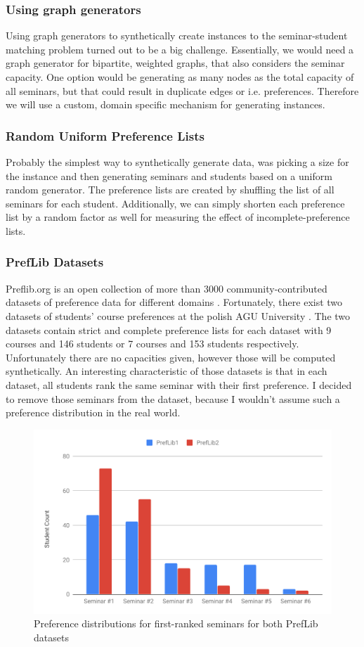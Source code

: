 \subsubsection{Using graph generators}
Using graph generators to synthetically create instances to the seminar-student matching problem turned out to be a big challenge. Essentially, we would need a graph generator for bipartite, weighted graphs, that also considers the seminar capacity. One option would be generating as many nodes as the total capacity of all seminars, but that could result in duplicate edges or i.e. preferences. Therefore we will use a custom, domain specific mechanism for generating instances.

\subsubsection{Random Uniform Preference Lists}
Probably the simplest way to synthetically generate data, was picking a size for the instance and then generating seminars and students based on a uniform random generator. The preference lists are created by shuffling the list of all seminars for each student. Additionally, we can simply shorten each preference list by a random factor as well for measuring the effect of incomplete-preference lists.

\subsubsection{PrefLib Datasets}
Preflib.org is an open collection of more than 3000 community-contributed datasets of preference data for different domains \cite{PrefLib}. Fortunately, there exist two datasets of students' course preferences at the polish AGU University \cite{preflib-dataset}. The two datasets contain strict and complete preference lists for each dataset with 9 courses and 146 students or 7 courses and 153 students respectively. Unfortunately there are no capacities given, however those will be computed synthetically. An interesting characteristic of those datasets is that in each dataset, all students rank the same seminar with their first preference. I decided to remove those seminars from the dataset, because I wouldn't assume such a preference distribution in the real world.

\begin{figure}[h!]
    \centering
    \includegraphics[width=0.8\linewidth]{assets/plots/prelib-distr.pdf}
    \caption{Preference distributions for first-ranked seminars for both PrefLib datasets}
    \label{fig:preflib-distribution}
\end{figure}

